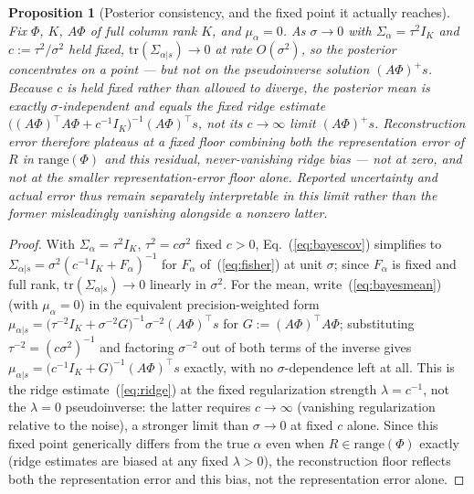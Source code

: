 \documentclass[11pt]{article}
\newtheorem{Proposition}{Proposition}
\begin{document}
\begin{Proposition}[Posterior consistency, and the fixed point it actually reaches]
\label{prop:consistency}
Fix $\Phi$, $K$, $A\Phi$ of full column rank $K$, and $\mu_\alpha=0$. As $\sigma\to0$ with $\Sigma_\alpha=\tau^2I_K$ and $c:=\tau^2/\sigma^2$ held fixed, $\mathrm{tr}(\Sigma_{\alpha|s})\to0$ at rate $O(\sigma^2)$, so the posterior concentrates on a point --- but \emph{not} on the pseudoinverse solution $(A\Phi)^+s$. Because $c$ is held fixed rather than allowed to diverge, the posterior mean is exactly $\sigma$-independent and equals the fixed ridge estimate $\big((A\Phi)^\top A\Phi+c^{-1}I_K\big)^{-1}(A\Phi)^\top s$, not its $c\to\infty$ limit $(A\Phi)^+s$. Reconstruction error therefore plateaus at a fixed floor combining both the representation error of $R$ in $\mathrm{range}(\Phi)$ and this residual, never-vanishing ridge bias --- not at zero, and not at the smaller representation-error floor alone. Reported uncertainty and actual error thus remain separately interpretable in this limit rather than the former misleadingly vanishing alongside a nonzero latter.
\end{Proposition}
\begin{proof}
With $\Sigma_\alpha=\tau^2I_K$, $\tau^2=c\sigma^2$ fixed $c>0$, Eq.~(\ref{eq:bayescov}) simplifies to $\Sigma_{\alpha|s}=\sigma^2(c^{-1}I_K+F_\alpha)^{-1}$ for $F_\alpha$ of~(\ref{eq:fisher}) at unit $\sigma$; since $F_\alpha$ is fixed and full rank, $\mathrm{tr}(\Sigma_{\alpha|s})\to0$ linearly in $\sigma^2$. For the mean, write~(\ref{eq:bayesmean}) (with $\mu_\alpha=0$) in the equivalent precision-weighted form $\mu_{\alpha|s}=\big(\tau^{-2}I_K+\sigma^{-2}G\big)^{-1}\sigma^{-2}(A\Phi)^\top s$ for $G:=(A\Phi)^\top A\Phi$; substituting $\tau^{-2}=(c\sigma^2)^{-1}$ and factoring $\sigma^{-2}$ out of both terms of the inverse gives $\mu_{\alpha|s}=\big(c^{-1}I_K+G\big)^{-1}(A\Phi)^\top s$ exactly, with no $\sigma$-dependence left at all. This is the ridge estimate~(\ref{eq:ridge}) at the fixed regularization strength $\lambda=c^{-1}$, not the $\lambda=0$ pseudoinverse: the latter requires $c\to\infty$ (vanishing regularization relative to the noise), a stronger limit than $\sigma\to0$ at fixed $c$ alone. Since this fixed point generically differs from the true $\alpha$ even when $R\in\mathrm{range}(\Phi)$ exactly (ridge estimates are biased at any fixed $\lambda>0$), the reconstruction floor reflects both the representation error and this bias, not the representation error alone.
\end{proof}
\end{document}
